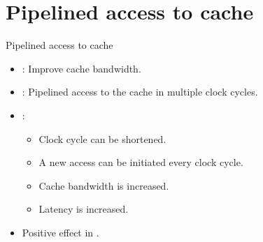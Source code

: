 \section{Pipelined access to cache}

\begin{frame}[t]{Pipelined access to cache}
\begin{itemize}
  \item {}: Improve cache bandwidth. 

  \item {}: Pipelined access to the cache in multiple clock cycles.

  \item {}:
    \begin{itemize}
      \item Clock cycle can be shortened.
      \item A new access can be initiated every clock cycle.
      \item Cache bandwidth is increased.
      \item Latency is increased.
    \end{itemize}

  \item Positive effect in .
\end{itemize}
\end{frame}

